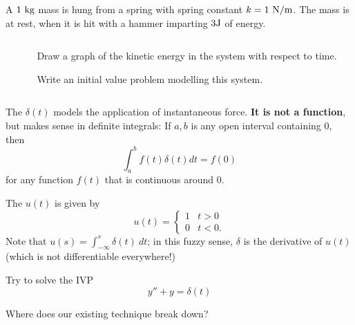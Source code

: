 \begin{applicationActivities}

\begin{activity}{10}
A \(1\ {\rm kg}\) mass is hung from a spring with spring constant \(k=1\ {\rm N/m}\).  The mass is at rest, when it is hit with a hammer imparting \(3 {\rm J}\) of energy.
\vfill
\begin{columns}
\begin{column}{0.3\textwidth}
\begin{center}
\springmass
\end{center}
\end{column}
\begin{column}{0.7\textwidth}
\begin{subactivity}
Draw a graph of the kinetic energy in the system with respect to time.
\end{subactivity}
\begin{subactivity}
Write an initial value problem modelling this system.
\end{subactivity}
\end{column}
\end{columns}
\end{activity}

\begin{definition}
The  \(\delta(t)\) models the application of instantaneous force.  \textbf{It is not a function}, but makes sense in definite integrals: 
\vfill
If \(a,b\) is any open interval containing \(0\), then
\[ \int _a ^b f(t)\delta(t)dt = f(0)\]
for any function \(f(t)\) that is continuous around \(0\).
\end{definition}

\begin{definition}
The  \(u(t)\) is given by \[u(t)=\begin{cases} 1 & t > 0 \\ 0 & t<0. \end{cases}\]
\vfill
Note that \(u(s)=\int _{-\infty} ^s  \delta(t)\ dt\); in this fuzzy sense, \(\delta\) is the derivative of \(u(t)\) (which is not differentiable everywhere!)
\end{definition}

\begin{activity}{10}
Try to solve the IVP 
\[y''+y=\delta(t)\]

\vfill
Where does our existing technique break down?
\end{activity}


\end{applicationActivities}

